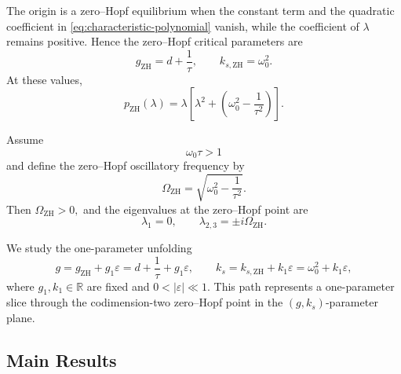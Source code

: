 \documentclass[11pt,reqno]{amsart}
\theoremstyle{plain}
\theoremstyle{definition}
\theoremstyle{remark}
\begin{document}
The origin is a zero--Hopf equilibrium when the constant term and the
quadratic coefficient in \eqref{eq:characteristic-polynomial} vanish,
while the coefficient of \(\lambda\) remains positive. Hence the
zero--Hopf critical parameters are
\begin{equation}
\label{eq:zero-Hopf-critical-parameters}
g_{\mathrm{ZH}}
=
d+\frac1\tau,
\qquad
k_{s,\mathrm{ZH}}
=
\omega_0^2.
\end{equation}
At these values,
\[
p_{\mathrm{ZH}}(\lambda)
=
\lambda
\left[
\lambda^2+
\left(
\omega_0^2-\frac1{\tau^2}
\right)
\right].
\]

Assume
\begin{equation}
\label{eq:zero-Hopf-frequency-condition}
\omega_0\tau>1
\end{equation}
and define the zero--Hopf oscillatory frequency by
\begin{equation}
\label{eq:zero-Hopf-frequency}
\Omega_{\mathrm{ZH}}
=
\sqrt{
\omega_0^2-\frac1{\tau^2}
}.
\end{equation}
Then
$
\Omega_{\mathrm{ZH}}>0,
$
and the eigenvalues at the zero--Hopf point are
\begin{equation}
\label{eq:zero-Hopf-spectrum}
\lambda_1=0,
\qquad
\lambda_{2,3}
=
\pm i\Omega_{\mathrm{ZH}}.
\end{equation}


We study the one-parameter unfolding
\begin{equation}
\label{eq:zero-Hopf-unfolding}
g
=
g_{\mathrm{ZH}}+g_1\varepsilon
=
d+\frac1\tau+g_1\varepsilon,
\qquad
k_s
=
k_{s,\mathrm{ZH}}+k_1\varepsilon
=
\omega_0^2+k_1\varepsilon,
\end{equation}
where \(g_1,k_1\in\mathbb R\) are fixed and
$
0<|\varepsilon|\ll1.
$
This path represents a one-parameter slice through the codimension-two
zero--Hopf point in the \((g,k_s)\)-parameter plane.

\subsection{Main Results}
\end{document}
